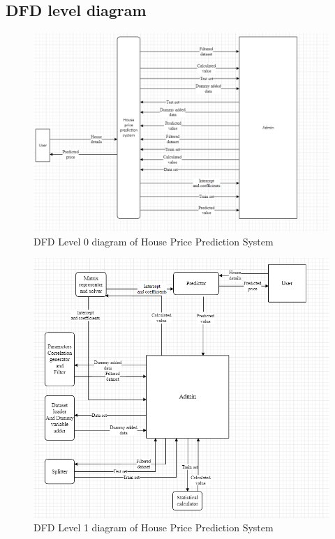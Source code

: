  \subsection{DFD level diagram}
\begin{figure}
\begin{center}
	\includegraphics[width=5in]{dfd0.png} 
	\caption{DFD Level 0 diagram of House Price Prediction System} %
	\label{DFD Level 0 diagram of House Price Prediction System} %
\end{center}
\end{figure}
\begin{figure}
\begin{center}
	\includegraphics[width=5in]{dfd12.png} 
	\caption{DFD Level 1 diagram of House Price Prediction System} %
	\label{DFD Level 1 diagram of House Price Prediction system} %
\end{center}
\end{figure}
\newpage
